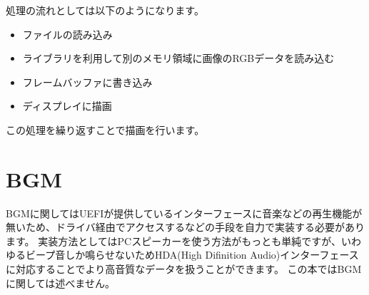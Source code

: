 \documentclass[10pt,b5paper,twoside,openany]{ltjsbook}
\begin{document}
処理の流れとしては以下のようになります。
\begin{itemize}
    \item ファイルの読み込み
    \item ライブラリを利用して別のメモリ領域に画像のRGBデータを読み込む
    \item フレームバッファに書き込み
    \item ディスプレイに描画
\end{itemize}
この処理を繰り返すことで描画を行います。

\section{BGM}
BGMに関してはUEFIが提供しているインターフェースに音楽などの再生機能が無いため、ドライバ経由でアクセスするなどの手段を自力で実装する必要があります。
実装方法としてはPCスピーカーを使う方法がもっとも単純ですが、いわゆるビープ音しか鳴らせないためHDA(High Difinition Audio)インターフェースに対応することでより高音質なデータを扱うことができます。
この本ではBGMに関しては述べません。
\end{document}
